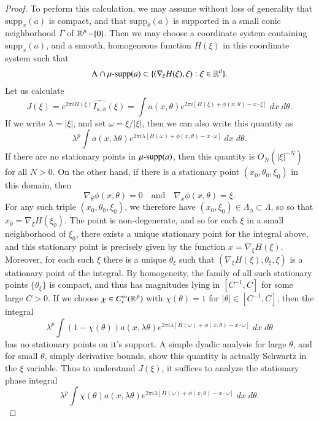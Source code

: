 \begin{proof}
    To perform this calculation, we may assume without loss of generality that $\text{supp}_x(a)$ is compact, and that $\text{supp}_\theta(a)$ is supported in a small conic neighborhood $\Gamma$ of $\operatorname{\mathbb{R}}^p - \{ 0 \}$. Then we may choose a coordinate system containing $\text{supp}_x(a)$, and a smooth, homogeneous function $H(\xi)$ in this coordinate system such that
    \[ \Lambda \cap \operatorname{\text{$\mu$-supp}}(a) \subset \{ (\nabla_\xi H(\xi), \xi) : \xi \in \operatorname{\mathbb{R}}^d \}. \]
    Let us calculate
    \[ J(\xi) = e^{2 \pi i H(\xi)} \widehat{I_{a,\phi}}(\xi) = \int a(x,\theta) e^{2 \pi i [ H(\xi) + \phi(x,\theta) - x \cdot \xi ]}\; dx\; d\theta. \]
    If we write $\lambda = |\xi|$, and set $\omega = \xi / |\xi|$, then we can also write this quantity as
    \[ \lambda^p \int a(x, \lambda \theta) e^{2 \pi i \lambda [ H(\omega) + \phi(x,\theta) - x \cdot \omega ]}\; dx\; d\theta. \]
    If there are no stationary points in $\operatorname{\text{$\mu$-supp}}(a)$, then this quantity is $O_N(|\xi|^{-N})$ for all $N > 0$. On the other hand, if there is a stationary point $(x_0,\theta_0,\xi_0)$ in this domain, then
    \[ \nabla_\theta \phi(x,\theta) = 0 \quad\text{and}\quad \nabla_x \phi(x,\theta) = \xi. \]
    For any such triple $(x_0,\theta_0,\xi_0)$, we therefore have $(x_0,\xi_0) \in \Lambda_\phi \subset \Lambda$, so so that $x_0 = \nabla_\xi H(\xi_0)$. The point is non-degenerate, and so for each $\xi$ in a small neighborhood of $\xi_0$, there exists a unique stationary point for the integral above, and this stationary point is precisely given by the function $x = \nabla_\xi H(\xi)$. Moreover, for each such $\xi$ there is a unique $\theta_\xi$ such that $(\nabla_\xi H(\xi), \theta_\xi, \xi)$ is a stationary point of the integral. By homogeneity, the family of all such stationary points $\{ \theta_\xi \}$ is compact, and thus has magnitudes lying in $[C^{-1}, C]$ for some large $C > 0$. If we choose $\chi \in C_c^\infty(\operatorname{\mathbb{R}}^p)$ with $\chi(\theta) = 1$ for $|\theta| \in [C^{-1}, C]$, then the integral
    \[ \lambda^p \int (1 - \chi(\theta)) a(x, \lambda \theta) e^{2 \pi i \lambda [ H(\omega) + \phi(x,\theta) - x \cdot \omega ]}\; dx\; d\theta \]
    has no stationary points on it's support. A simple dyadic analysis for large $\theta$, and for small $\theta$, simply derivative bounds, show this quantity is actually Schwartz in the $\xi$ variable. Thus to understand $J(\xi)$, it suffices to analyze the stationary phase integral
    \[ \lambda^p \int \chi(\theta) a(x, \lambda \theta) e^{2 \pi i \lambda [ H(\omega) + \phi(x,\theta) - x \cdot \omega ]}\; dx\; d\theta. \]

\end{proof}
